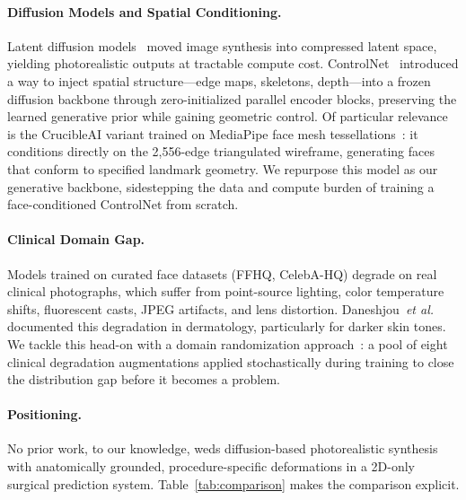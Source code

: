 \documentclass[runningheads]{llncs}
\newcommand{\etal}{\textit{et al.}}
\begin{document}
\paragraph{Diffusion Models and Spatial Conditioning.}
Latent diffusion models~\cite{rombach2022ldm} moved image synthesis into
compressed latent space, yielding photorealistic outputs at tractable
compute cost.  ControlNet~\cite{zhang2023controlnet} introduced a way to
inject spatial structure---edge maps, skeletons, depth---into a frozen
diffusion backbone through zero-initialized parallel encoder blocks,
preserving the learned generative prior while gaining geometric control.
Of particular relevance is the CrucibleAI variant trained on
MediaPipe face mesh tessellations~\cite{crucibleai_controlnet}: it
conditions directly on the 2,556-edge triangulated wireframe, generating
faces that conform to specified landmark geometry.  We repurpose this
model as our generative backbone, sidestepping the data and compute
burden of training a face-conditioned ControlNet from scratch.

\paragraph{Clinical Domain Gap.}
Models trained on curated face datasets (FFHQ, CelebA-HQ) degrade on
real clinical photographs, which suffer from point-source lighting, color
temperature shifts, fluorescent casts, JPEG artifacts, and lens
distortion.  Daneshjou~\etal~\cite{daneshjou2022disparities} documented
this degradation in dermatology, particularly for darker skin tones.  We
tackle this head-on with a domain randomization
approach~\cite{tobin2017domain}: a pool of eight clinical degradation
augmentations applied stochastically during training to close the
distribution gap before it becomes a problem.

\paragraph{Positioning.}
No prior work, to our knowledge, weds diffusion-based photorealistic
synthesis with anatomically grounded, procedure-specific deformations in
a 2D-only surgical prediction system.  Table~\ref{tab:comparison} makes
the comparison explicit.
\end{document}
